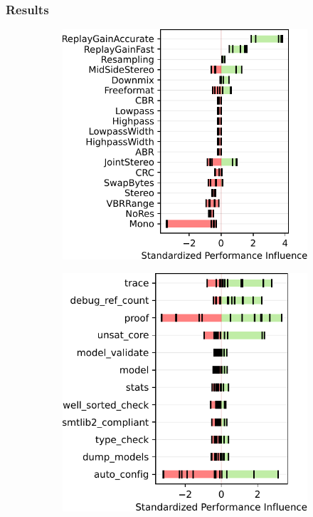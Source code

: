 {{{\subsubsection{Results}\label{sec:results2}

\begin{figure}
	
	\begin{subfigure}{0.3\linewidth}
		\centering
		\includegraphics[width=\linewidth]{images/jump3r.pdf}
		\caption{\jumper}
		\label{fig:overview_jump3r}
	\end{subfigure}
	\begin{subfigure}{0.3\linewidth}
		\centering
		\includegraphics[width=\linewidth]{images/z3.pdf}

\end{subfigure}
\end{figure}}}}
